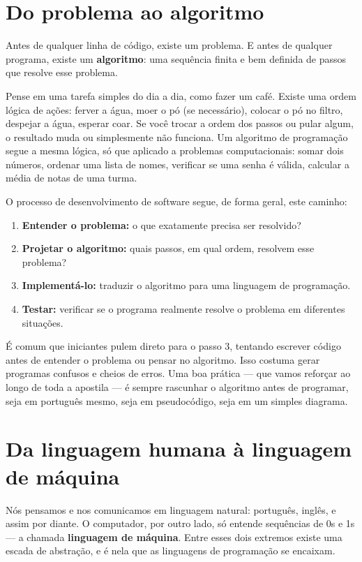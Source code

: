 \documentclass[12pt,a4paper,oneside]{extreport}
\begin{document}
\section{Do problema ao algoritmo}

Antes de qualquer linha de código, existe um problema. E antes de qualquer programa, existe um \textbf{algoritmo}: uma sequência finita e bem definida de passos que resolve esse problema.

Pense em uma tarefa simples do dia a dia, como fazer um café. Existe uma ordem lógica de ações: ferver a água, moer o pó (se necessário), colocar o pó no filtro, despejar a água, esperar coar. Se você trocar a ordem dos passos ou pular algum, o resultado muda ou simplesmente não funciona. Um algoritmo de programação segue a mesma lógica, só que aplicado a problemas computacionais: somar dois números, ordenar uma lista de nomes, verificar se uma senha é válida, calcular a média de notas de uma turma.

O processo de desenvolvimento de software segue, de forma geral, este caminho:


\begin{enumerate}

\item \textbf{Entender o problema:} o que exatamente precisa ser resolvido?
\item \textbf{Projetar o algoritmo:} quais passos, em qual ordem, resolvem esse problema?
\item \textbf{Implementá-lo:} traduzir o algoritmo para uma linguagem de programação.
\item \textbf{Testar:} verificar se o programa realmente resolve o problema em diferentes situações.

\end{enumerate}


É comum que iniciantes pulem direto para o passo 3, tentando escrever código antes de entender o problema ou pensar no algoritmo. Isso costuma gerar programas confusos e cheios de erros. Uma boa prática — que vamos reforçar ao longo de toda a apostila — é sempre rascunhar o algoritmo antes de programar, seja em português mesmo, seja em pseudocódigo, seja em um simples diagrama.


\section{Da linguagem humana à linguagem de máquina}

Nós pensamos e nos comunicamos em linguagem natural: português, inglês, e assim por diante. O computador, por outro lado, só entende sequências de 0s e 1s — a chamada \textbf{linguagem de máquina}. Entre esses dois extremos existe uma escada de abstração, e é nela que as linguagens de programação se encaixam.
\end{document}
